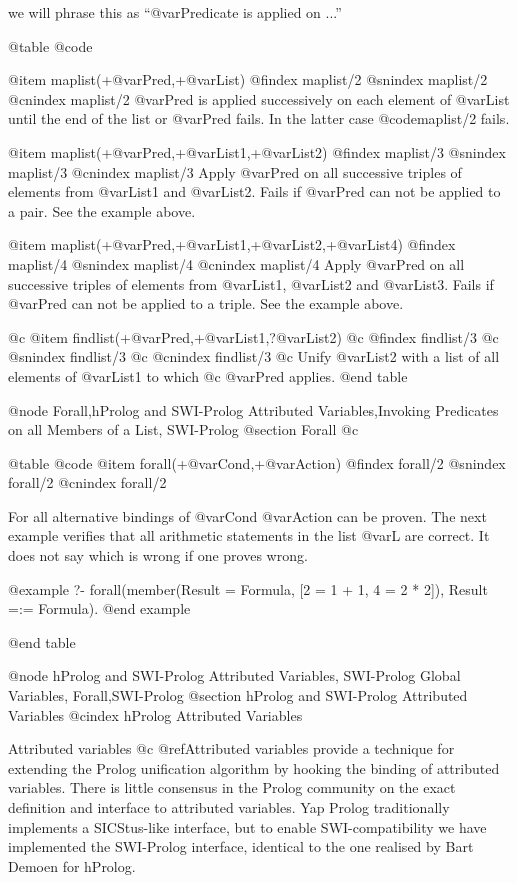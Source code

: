 we will phrase this as ``@var{Predicate} is applied on ...''

@table @code

@item maplist(+@var{Pred},+@var{List})
@findex maplist/2
@snindex maplist/2
@cnindex maplist/2
@var{Pred} is applied successively on each element of @var{List} until
the end of the list or @var{Pred} fails. In the latter case 
@code{maplist/2} fails.

@item maplist(+@var{Pred},+@var{List1},+@var{List2})
@findex maplist/3
@snindex maplist/3
@cnindex maplist/3
Apply @var{Pred} on all successive triples of elements from
@var{List1} and
@var{List2}. Fails if @var{Pred} can not be applied to a
pair. See the example above.

@item maplist(+@var{Pred},+@var{List1},+@var{List2},+@var{List4})
@findex maplist/4
@snindex maplist/4
@cnindex maplist/4
Apply @var{Pred} on all successive triples of elements from @var{List1},
@var{List2} and @var{List3}. Fails if @var{Pred} can not be applied to a
triple. See the example above.

@c @item findlist(+@var{Pred},+@var{List1},?@var{List2})
@c @findex findlist/3
@c @snindex findlist/3
@c @cnindex findlist/3
@c Unify @var{List2} with a list of all elements of @var{List1} to which
@c @var{Pred} applies.
@end table

@node Forall,hProlog and SWI-Prolog Attributed Variables,Invoking Predicates on all Members of a List, SWI-Prolog
@section Forall			
@c \label{sec:forall2}

@table @code
@item forall(+@var{Cond},+@var{Action})
@findex forall/2
@snindex forall/2
@cnindex forall/2

For all alternative bindings of @var{Cond} @var{Action} can be proven.
The next example verifies that all arithmetic statements in the list
@var{L} are correct. It does not say which is wrong if one proves wrong.

@example
?- forall(member(Result = Formula, [2 = 1 + 1, 4 = 2 * 2]),
                 Result =:= Formula).
@end example

@end table

@node hProlog and SWI-Prolog Attributed Variables, SWI-Prolog Global Variables, Forall,SWI-Prolog
@section hProlog and SWI-Prolog Attributed Variables
@cindex hProlog Attributed Variables

Attributed variables
@c @ref{Attributed variables}
provide a technique for extending the
Prolog unification algorithm by hooking the binding of attributed
variables. There is little consensus in the Prolog community on the
exact definition and interface to attributed variables.  Yap Prolog
traditionally implements a SICStus-like interface, but to enable
SWI-compatibility we have implemented the SWI-Prolog interface,
identical to the one realised by Bart Demoen for hProlog.

